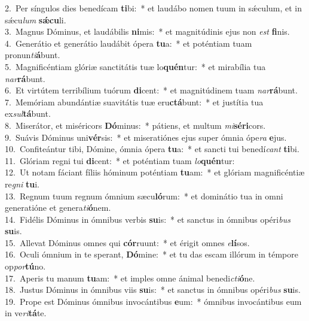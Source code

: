 {2.~}Per síngulos dies benedícam \textbf{ti}bi:~* et laudábo nomen tuum in sǽculum, et in sǽcu\textit{lum} \textbf{sǽ}\textbf{cu}li.\\
{3.~}Magnus Dóminus, et laudábilis \textbf{ni}mis:~* et magnitúdinis ejus non \textit{est} \textbf{fi}nis.\\
{4.~}Generátio et generátio laudábit ópera \textbf{tu}a:~* et poténtiam tuam pronun\textit{ti}\textbf{á}bunt.\\
{5.~}Magnificéntiam glóriæ sanctitátis tuæ lo\textbf{quén}tur:~* et mirabília tua \textit{nar}\textbf{rá}bunt.\\
{6.~}Et virtútem terribílium tuórum \textbf{di}cent:~* et magnitúdinem tuam \textit{nar}\textbf{rá}bunt.\\
{7.~}Memóriam abundántiæ suavitátis tuæ eru\textbf{ctá}bunt:~* et justítia tua ex\textit{sul}\textbf{tá}bunt.\\
{8.~}Miserátor, et miséricors \textbf{Dó}minus:~* pátiens, et multum \textit{mi}\textbf{sé}\textbf{ri}cors.\\
{9.~}Suávis Dóminus uni\textbf{vér}sis:~* et miseratiónes ejus super ómnia ópe\textit{ra} \textbf{e}jus.\\
{10.~}Confiteántur tibi, Dómine, ómnia ópera \textbf{tu}a:~* et sancti tui benedí\textit{cant} \textbf{ti}bi.\\
{11.~}Glóriam regni tui \textbf{di}cent:~* et poténtiam tuam \textit{lo}\textbf{quén}tur:\\
{12.~}Ut notam fáciant fíliis hóminum poténtiam \textbf{tu}am:~* et glóriam magnificéntiæ re\textit{gni} \textbf{tu}i.\\
{13.~}Regnum tuum regnum ómnium sæcu\textbf{ló}rum:~* et dominátio tua in omni generatióne et genera\textit{ti}\textbf{ó}nem.\\
{14.~}Fidélis Dóminus in ómnibus verbis \textbf{su}is:~* et sanctus in ómnibus opéri\textit{bus} \textbf{su}is.\\
{15.~}Allevat Dóminus omnes qui \textbf{cór}ruunt:~* et érigit omnes \textit{e}\textbf{lí}sos.\\
{16.~}Oculi ómnium in te sperant, \textbf{Dó}mine:~* et tu das escam illórum in témpore op\textit{por}\textbf{tú}no.\\
{17.~}Aperis tu manum \textbf{tu}am:~* et imples omne ánimal benedi\textit{cti}\textbf{ó}ne.\\
{18.~}Justus Dóminus in ómnibus viis \textbf{su}is:~* et sanctus in ómnibus opéri\textit{bus} \textbf{su}is.\\
{19.~}Prope est Dóminus ómnibus invocántibus \textbf{e}um:~* ómnibus invocántibus eum in ve\textit{ri}\textbf{tá}te.\\
